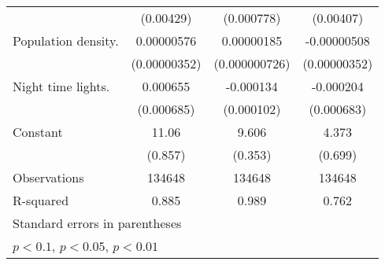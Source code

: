 {\begin{tabular}{l*{3}{c}}
                    &   (0.00429)         &  (0.000778)         &   (0.00407)         \\
\addlinespace
Population density. &  0.00000576         &  0.00000185\sym{**} & -0.00000508         \\
                    &(0.00000352)         &(0.000000726)         &(0.00000352)         \\
\addlinespace
Night time lights.  &    0.000655         &   -0.000134         &   -0.000204         \\
                    &  (0.000685)         &  (0.000102)         &  (0.000683)         \\
\addlinespace
Constant            &       11.06\sym{***}&       9.606\sym{***}&       4.373\sym{***}\\
                    &     (0.857)         &     (0.353)         &     (0.699)         \\
\midrule
Observations        &      134648         &      134648         &      134648         \\
R-squared           &       0.885         &       0.989         &       0.762         \\
\bottomrule
\multicolumn{4}{l}{\footnotesize Standard errors in parentheses}\\
\multicolumn{4}{l}{\footnotesize \sym{*} \(p<0.1\), \sym{**} \(p<0.05\), \sym{***} \(p<0.01\)}\\
\end{tabular}
}
